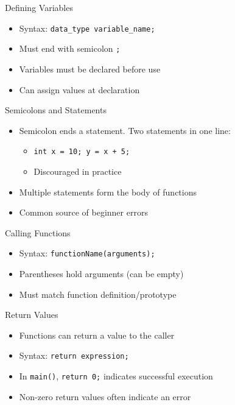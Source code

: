 \documentclass[12pt, aspectratio=169]{beamer}
\begin{document}
    \begin{frame}{Defining Variables}
        \begin{itemize}
            \item Syntax: \texttt{data\_type variable\_name;}
            \item Must end with semicolon \texttt{;}
            \item Variables must be declared before use
            \item Can assign values at declaration
        \end{itemize}
    \end{frame}


    \begin{frame}{Semicolons and Statements}
        \begin{itemize}
            \item Semicolon ends a statement. Two statements in one line:
            \begin{itemize}
                \item \texttt{int x = 10; y = x + 5;}
                \item Discouraged in practice
            \end{itemize}
            \item Multiple statements form the body of functions
            \item Common source of beginner errors
        \end{itemize}
    \end{frame}


    \begin{frame}{Calling Functions}
        \begin{itemize}
            \item Syntax: \texttt{functionName(arguments);}
            \item Parentheses hold arguments (can be empty)
            \item Must match function definition/prototype
        \end{itemize}
    \end{frame}


    \begin{frame}{Return Values}
        \begin{itemize}
            \item Functions can return a value to the caller
            \item Syntax: \texttt{return expression;}
            \item In \texttt{main()}, \texttt{return 0;} indicates successful execution
            \item Non-zero return values often indicate an error
        \end{itemize}
    \end{frame}
\end{document}
